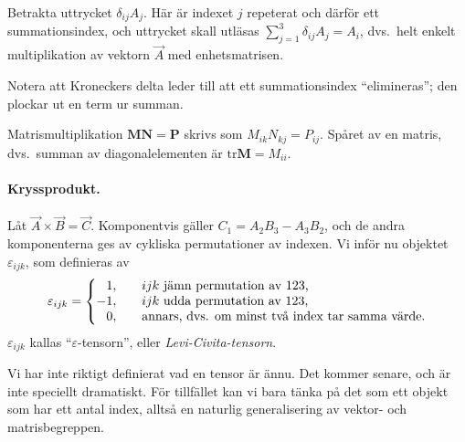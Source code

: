 \documentclass[%
oneside,                 %
final,                   %
10pt]{article}
\newenvironment{notice_mdfboxadmon}[1][]{
\begin{notice_mdfboxmdframed}[frametitle=#1]
}
{
\end{notice_mdfboxmdframed}
}
\newenvironment{warning_mdfboxadmon}[1][]{
\begin{warning_mdfboxmdframed}[frametitle=#1]
}
{
\end{warning_mdfboxmdframed}
}
\begin{document}
Betrakta uttrycket $\delta_{ij}A_j$. Här är indexet $j$ repeterat och därför ett summationsindex, och uttrycket skall utläsas $\sum_{j=1}^3\delta_{ij}A_j=A_i$, dvs.~helt enkelt multiplikation av vektorn $\vec{A}$ med enhetsmatrisen.

\begin{warning_mdfboxadmon}[Kommentar]
Notera att Kroneckers delta leder till att ett summationsindex ``elimineras''; den plockar ut en term ur summan.
\end{warning_mdfboxadmon} %




\begin{notice_mdfboxadmon}
Matrismultiplikation $\mathbf{M}\mathbf{N}=\mathbf{P}$ skrivs som $M_{ik}N_{kj}=P_{ij}$. Spåret av en matris, dvs.~summan av diagonalelementen är $\mathrm{tr}\mathbf{M}=M_{ii}$.
\end{notice_mdfboxadmon} %



\paragraph{Kryssprodukt.}
Låt $\vec{A}\times\vec{B}=\vec{C}$. Komponentvis gäller $C_1=A_2B_3-A_3B_2$, och de andra komponenterna ges av cykliska permutationer av indexen. Vi inför nu objektet $\varepsilon_{ijk}$, som definieras av
\begin{equation}
\varepsilon_{ijk}=\left\{
\begin{matrix}
\phantom{-}1,\quad\hfill&ijk\hbox{ jämn permutation av 123,}\hfill\cr
-1,\quad\hfill&ijk\hbox{ udda permutation av 123,}\hfill\cr
\phantom{-}0,\hfill&\hbox{annars, dvs. om minst två index tar samma
värde.}
\end{matrix}
\right.
\end{equation}
$\varepsilon_{ijk}$ kallas ``$\varepsilon$-tensorn'', eller \emph{Levi-Civita-tensorn}. 


\begin{warning_mdfboxadmon}[Kommentar]
Vi har inte riktigt definierat vad en tensor är ännu. Det kommer senare, och är inte speciellt dramatiskt. För tillfället kan vi bara tänka på det som ett objekt som har ett antal index, alltså en naturlig generalisering av vektor- och matrisbegreppen.
\end{warning_mdfboxadmon} %
\end{document}
